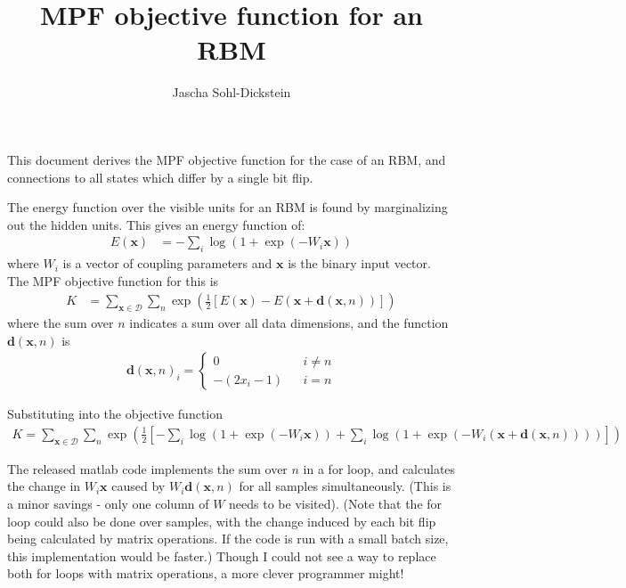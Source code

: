 \documentclass{article}
\title{MPF objective function for an RBM}
\author{
Jascha Sohl-Dickstein
}
\newcommand{\mb}{\mathbf}
\begin{document}
\maketitle

This document derives the MPF objective function for the case of an RBM, and connections to all states which differ by a single bit flip. %

The energy function over the visible
units for an RBM is found by marginalizing out the hidden units.  This
gives an energy function of:
\begin{align}
E(\mb x) &= -\sum_i \log ( 1 + \exp ( -W_i \mb x ) )
\end{align}
where $W_i$ is a vector of coupling parameters and $\mb x$ is the binary input
vector.  The MPF objective function for this is
\begin{align}
K &= \sum_{\mb x \in \mathcal D} \sum_n \exp\left( \frac{1}{2}\left[
E(\mb x) - E(\mb x + {\mb d}(\mb x, n)) \right] \right)
\end{align}
where the sum over $n$ indicates a sum over all data dimensions, and
the function ${\mb d}(\mb x, n)$ is
\begin{align}
{\mb d}(\mb x, n)_i =
	\left\{\begin{array}{ccc}
0 & & i \neq n \\
-(2 x_i - 1) & & i = n
	\end{array}\right.
\end{align}

Substituting into the objective function
\begin{align}
K = \sum_{\mb x \in \mathcal D} \sum_n \exp\left( \frac{1}{2}\left[
-\sum_i \log ( 1 + \exp ( -W_i \mb x ) )
+
\sum_i \log ( 1 + \exp ( -W_i \left(  \mb x + {\mb d}(\mb x, n) \right) ) )
\right] \right)
\end{align}

The released matlab code implements the sum over $n$ in a for loop, and
calculates the change in $W_i \mb x$ caused by $W_i {\mb d}( \mb x, n)$ for all samples simultaneously.  (This is a minor savings - only one column of $W$ needs to be visited).  (Note that the for loop could also
be done over samples, with the change induced by each bit flip being
calculated by matrix operations.  If the code is run with a small
batch size, this implementation would be faster.)  Though I could not
see a way to replace both for loops with matrix operations, a more
clever programmer might!
		
\end{document}
